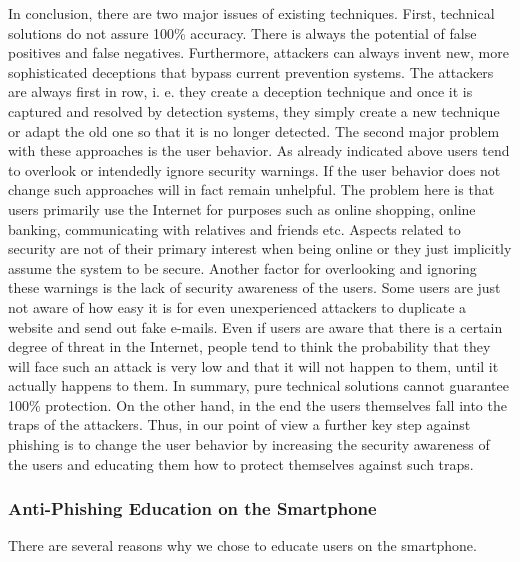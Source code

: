 In conclusion, there are two major issues of existing techniques.
 First, technical solutions do not assure 100\% accuracy.
 There is always the potential of false positives and false negatives.
 Furthermore, attackers can always invent new, more sophisticated deceptions that bypass current prevention systems.
 The attackers are always first in row, i.
e.
 they create a deception technique and once it is captured and resolved by detection systems, they simply create a new technique or adapt the old one so that it is no longer detected.
 The second major problem with these approaches is the user behavior.
 As already indicated above users tend to overlook or intendedly ignore security warnings.
 If the user behavior does not change such approaches will in fact remain unhelpful.
 The problem here is that users primarily use the Internet for purposes such as online shopping, online banking, communicating with relatives and friends etc.
 Aspects related to security are not of their primary interest when being online or they just implicitly assume the system to be secure.
 Another factor for overlooking and ignoring these warnings is the lack of security awareness of the users.
 Some users are just not aware of how easy it is for even unexperienced attackers to duplicate a website and send out fake e-mails.
 Even if users are aware that there is a certain degree of threat in the Internet, people tend to think the probability that they will face such an attack is very low and that it will not happen to them, until it actually happens to them.
 In summary, pure technical solutions cannot guarantee 100\% protection.
 On the other hand, in the end the users themselves fall into the traps of the attackers.
 Thus, in our point of view a further key step against phishing is to change the user behavior by increasing the security awareness of the users and educating them how to protect themselves against such traps.



\subsubsection{Anti-Phishing Education on the Smartphone}
\label{s:antiphishing_on_smartphone}
There are several reasons why we chose to educate users on the smartphone.

